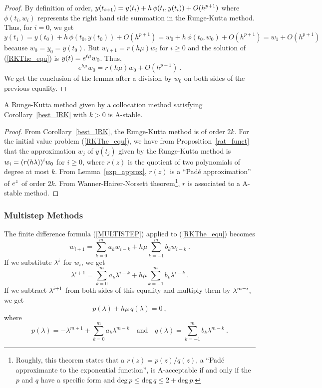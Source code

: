 \begin{proof}
By definition of order,
$\displaystyle y(t_{i+1}) = y(t_i) + h\,\phi(t_i,y(t_i)) + O(h^{p+1})$ where
$\phi(t_i,w_i)$ represents the right hand side summation in the
Runge-Kutta method.  Thus, for $i=0$, we get
\[
y(t_1) = y(t_0) + h\,\phi(t_0,y(t_0)) + O(h^{p+1})
= w_0 + h\,\phi(t_0,w_0) + O(h^{p+1}) = w_1+O(h^{p+1})
\]
because $w_0 = y_0 = y(t_0)$.
But $w_{i+1} = r(h\mu)w_i$ for $i\geq 0$ and the solution
of (\ref{RKThe_equ}) is $\displaystyle y(t) = e^{t\mu}w_0$.  Thus,
\[
  e^{h\mu}w_0 = r(h\mu)w_0 + O(h^{p+1}) \ .
\]
We get the conclusion of the lemma after a division by $w_0$ on both
sides of the previous equality.
\end{proof}

\begin{theorem}
A Runge-Kutta method given by a collocation method satisfying
Corollary~\ref{best_IRK} with $k>0$ is A-stable.
\label{RKcolAstable}
\end{theorem}

\begin{proof}
From Corollary~\ref{best_IRK}, the Runge-Kutta method is of order
$2k$.  For the initial value problem (\ref{RKThe_equ}), we have from
Proposition~\ref{rat_funct} that the approximation $w_j$ of $y(t_j)$ given
by the Runge-Kutta method is
$\displaystyle w_i = (r(h\lambda))^iw_0$ for $i\geq 0$,
where $r(z)$ is the quotient of two polynomials of degree at most $k$.
From Lemma~\ref{exp_approx}, $r(z)$ is a ``Pad\'e approximation'' of
$\displaystyle e^z$ of order $2k$.  From Wanner-Hairer-Norsett
theorem\footnote{Roughly, this theorem states that a $r(z) = p(z)/q(z)$,
a ``Pad\'e approximante to the exponential function'', is
A-acceptable if and only if the $p$ and $q$ have a specific form and
$\text{deg}\,p \leq \text{deg}\,q \leq 2 + \text{deg}\,p$.}, $r$ is
associated to a A-stable method.
\end{proof}

\subsubsection{Multistep Methods}

The finite difference formula (\ref{MULTISTEP})
applied to (\ref{RKThe_equ}) becomes
\[
w_{i+1} = \sum_{k=0}^m a_k w_{i-k} + h \mu \sum_{k=-1}^m b_k w_{i-k}\   .
\]
If we substitute $\displaystyle \lambda^i$ for $w_i$, we get
\[
  \lambda^{i+1} = \sum_{k=0}^m a_k \lambda^{i-k} + h \mu
  \sum_{k=-1}^m b_k \lambda^{i-k} \ .
\]
If we subtract $\displaystyle \lambda^{i+1}$ from both sides of this equality
and multiply them by $\displaystyle \lambda^{m-i}$, we get
\[
p(\lambda) +h\mu\, q(\lambda) = 0 \ ,
\]
where
\[
p(\lambda) = - \lambda^{m+1} + \sum_{k=0}^m a_k \lambda^{m-k}
\quad \text{and} \quad
q(\lambda) = \sum_{k=-1}^m  b_k \lambda^{m-k} \ .
\]

